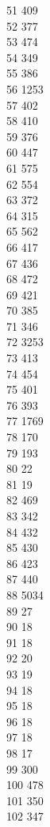 { 51	409 \\
 52	377 \\
 53	474 \\
 54	349 \\
 55	386 \\
 56	1253 \\
 57	402 \\
 58	410 \\
 59	376 \\
 60	447 \\
 61	575 \\
 62	554 \\
 63	372 \\
 64	315 \\
 65	562 \\
 66	417 \\
 67	436 \\
 68	472 \\
 69	421 \\
 70	385 \\
 71	346 \\
 72	3253 \\
 73	413 \\
 74	454 \\
 75	401 \\
 76	393 \\
 77	1769 \\
 78	170 \\
 79	193 \\
 80	22 \\
 81	19 \\
 82	469 \\
 83	342 \\
 84	432 \\
 85	430 \\
 86	423 \\
 87	440 \\
 88	5034 \\
 89	27 \\
 90	18 \\
 91	18 \\
 92	20 \\
 93	19 \\
 94	18 \\
 95	18 \\
 96	18 \\
 97	18 \\
 98	17 \\
 99	300 \\
 100	478 \\
 101	350 \\
 102	347 \\
}
